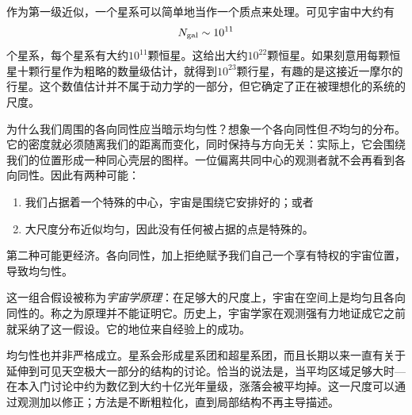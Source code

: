 作为第一级近似，一个星系可以简单地当作一个质点来处理。可见宇宙中大约有
\begin{equation}
N_{\rm gal}\sim 10^{11}
\end{equation}
个星系，每个星系有大约\(10^{11}\)颗恒星。这给出大约\(10^{22}\)颗恒星。如果刻意用每颗恒星十颗行星作为粗略的数量级估计，就得到\(10^{23}\)颗行星，有趣的是这接近一摩尔的行星。这个数值估计并不属于动力学的一部分，但它确定了正在被理想化的系统的尺度。

\begin{classroomqa}
\end{classroomqa}

为什么我们周围的各向同性应当暗示均匀性？想象一个各向同性但\emph{不}均匀的分布。它的密度就必须随离我们的距离而变化，同时保持与方向无关：实际上，它会围绕我们的位置形成一种同心壳层的图样。一位偏离共同中心的观测者就不会再看到各向同性。因此有两种可能：
\begin{enumerate}
\item 我们占据着一个特殊的中心，宇宙是围绕它安排好的；或者
\item 大尺度分布近似均匀，因此没有任何被占据的点是特殊的。
\end{enumerate}
第二种可能更经济。各向同性，加上拒绝赋予我们自己一个享有特权的宇宙位置，导致均匀性。

\begin{classroomqa}
\end{classroomqa}

这一组合假设被称为\emph{宇宙学原理}：在足够大的尺度上，宇宙在空间上是均匀且各向同性的。称之为原理并不能证明它。历史上，宇宙学家在观测强有力地证成它之前就采纳了这一假设。它的地位来自经验上的成功。

均匀性也并非严格成立。星系会形成星系团和超星系团，而且长期以来一直有关于延伸到可见天空极大一部分的结构的讨论。恰当的说法是，当平均区域足够大时---在本入门讨论中约为数亿到大约十亿光年量级，涨落会被平均掉。这一尺度可以通过观测加以修正；方法是不断粗粒化，直到局部结构不再主导描述。

